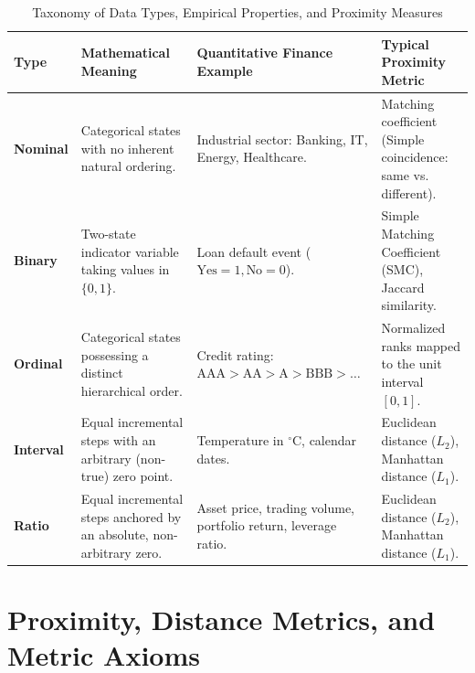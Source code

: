 \begin{table}[!htbp]
\centering
\caption{Taxonomy of Data Types, Empirical Properties, and Proximity Measures}
\label{tab:cluster_variable_types}
\vspace{0.2em}
\renewcommand{\arraystretch}{1.3}
\begin{tabularx}{\textwidth}{>{\bfseries}l>{\raggedright\arraybackslash}p{2.8cm}XX}
\toprule
Type & Mathematical Meaning & Quantitative Finance Example & Typical Proximity Metric \\
\midrule
Nominal & Categorical states with no inherent natural ordering. & Industrial sector: Banking, IT, Energy, Healthcare. & Matching coefficient (Simple coincidence: same vs. different). \\
Binary & Two-state indicator variable taking values in $\{0, 1\}$. & Loan default event ($\text{Yes} = 1, \text{No} = 0$). & Simple Matching Coefficient (SMC), Jaccard similarity. \\
Ordinal & Categorical states possessing a distinct hierarchical order. & Credit rating: $\text{AAA} > \text{AA} > \text{A} > \text{BBB} > \dots$ & Normalized ranks mapped to the unit interval $[0, 1]$. \\
Interval & Equal incremental steps with an arbitrary (non-true) zero point. & Temperature in $^\circ\text{C}$, calendar dates. & Euclidean distance ($L_2$), Manhattan distance ($L_1$). \\
Ratio & Equal incremental steps anchored by an absolute, non-arbitrary zero. & Asset price, trading volume, portfolio return, leverage ratio. & Euclidean distance ($L_2$), Manhattan distance ($L_1$). \\
\bottomrule
\end{tabularx}
\end{table}

\section{Proximity, Distance Metrics, and Metric Axioms}

